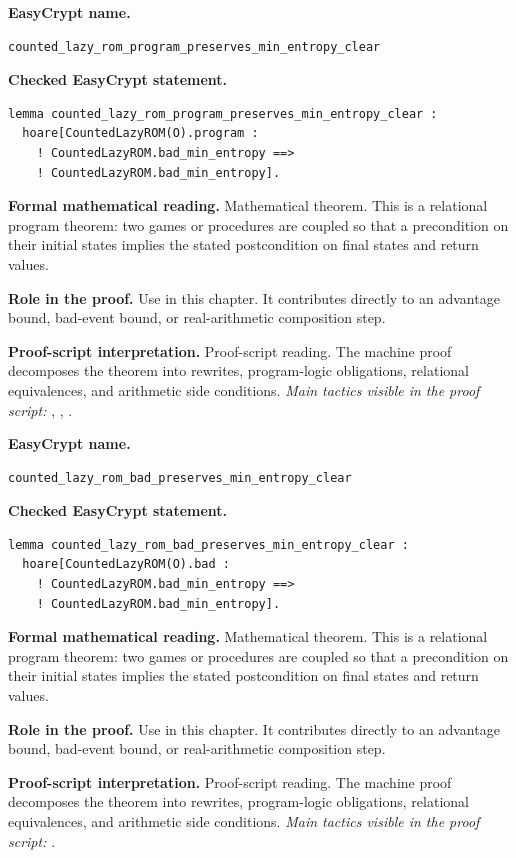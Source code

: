 \begin{formaltheorem}
\noindent\textbf{EasyCrypt name.}
\begin{lstlisting}[language=EasyCrypt,basicstyle=\ttfamily\scriptsize]
counted_lazy_rom_program_preserves_min_entropy_clear
\end{lstlisting}
\noindent\textbf{Checked EasyCrypt statement.}
\begin{lstlisting}[language=EasyCrypt,basicstyle=\ttfamily\scriptsize]
lemma counted_lazy_rom_program_preserves_min_entropy_clear :
  hoare[CountedLazyROM(O).program :
    ! CountedLazyROM.bad_min_entropy ==>
    ! CountedLazyROM.bad_min_entropy].
\end{lstlisting}
\noindent\textbf{Formal mathematical reading.}
Mathematical theorem. This is a relational program theorem: two games or procedures are coupled so that a precondition on their initial states implies the stated postcondition on final states and return values.

\noindent\textbf{Role in the proof.}
Use in this chapter. It contributes directly to an advantage bound, bad-event bound, or real-arithmetic composition step.

\noindent\textbf{Proof-script interpretation.}
Proof-script reading. The machine proof decomposes the theorem into rewrites, program-logic obligations, relational equivalences, and arithmetic side conditions.
\emph{Main tactics visible in the proof script:} , , .

\end{formaltheorem}

\begin{formaltheorem}
\noindent\textbf{EasyCrypt name.}
\begin{lstlisting}[language=EasyCrypt,basicstyle=\ttfamily\scriptsize]
counted_lazy_rom_bad_preserves_min_entropy_clear
\end{lstlisting}
\noindent\textbf{Checked EasyCrypt statement.}
\begin{lstlisting}[language=EasyCrypt,basicstyle=\ttfamily\scriptsize]
lemma counted_lazy_rom_bad_preserves_min_entropy_clear :
  hoare[CountedLazyROM(O).bad :
    ! CountedLazyROM.bad_min_entropy ==>
    ! CountedLazyROM.bad_min_entropy].
\end{lstlisting}
\noindent\textbf{Formal mathematical reading.}
Mathematical theorem. This is a relational program theorem: two games or procedures are coupled so that a precondition on their initial states implies the stated postcondition on final states and return values.

\noindent\textbf{Role in the proof.}
Use in this chapter. It contributes directly to an advantage bound, bad-event bound, or real-arithmetic composition step.

\noindent\textbf{Proof-script interpretation.}
Proof-script reading. The machine proof decomposes the theorem into rewrites, program-logic obligations, relational equivalences, and arithmetic side conditions.
\emph{Main tactics visible in the proof script:} .

\end{formaltheorem}


